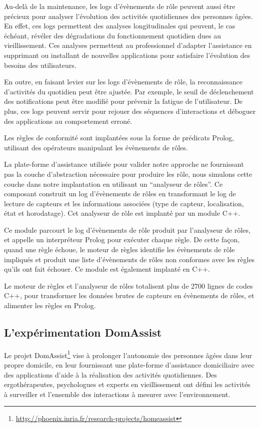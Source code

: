 Au-delà de la maintenance, les logs d'évènements de rôle peuvent aussi être 
précieux pour analyser l'évolution des activités quotidiennes des 
personnes âgées. En effet, ces logs permettent des analyses longitudinales qui 
peuvent, le cas échéant, révéler des dégradations du fonctionnement quotidien dues au 
vieillissement. Ces analyses permettent au professionnel d'adapter l'assistance 
en supprimant ou installant de nouvelles applications pour satisfaire l'évolution 
des besoins des utilisateurs. 

En outre, en faisant levier sur les logs d'évènements de rôle, la 
reconnaissance d'activités du quotidien peut être ajustée. Par exemple, le seuil 
de déclenchement des notifications peut être modifié pour prévenir la fatigue 
de l'utilisateur. De plus, ces logs peuvent servir pour rejouer des séquences 
d'interactions et déboguer des applications au comportement erroné.

Les règles de conformité sont implantées sous la forme de prédicats Prolog, utilisant 
des opérateurs manipulant les évènements de rôles. 

La plate-forme d'assistance utilisée pour valider notre approche ne fournissant 
pas la couche d'abstraction nécessaire pour produire les rôle, nous simulons 
cette couche dans notre implantation en utilisant un ``analyseur de rôles''. Ce 
composant construit un log d'évènements de rôles en transformant le log de 
lecture de capteurs et les informations associées (type de capteur, localisation, 
état et horodatage). Cet analyseur de rôle est implanté par un module C++.

Ce module parcourt le log d'évènements de rôle produit par l'analyseur de rôles, 
et appelle un interpréteur Prolog pour exécuter chaque règle. De cette façon, 
quand une règle échoue, le moteur de règles identifie les évènements de rôle 
impliqués et produit une liste d'évènements de rôles non conformes avec les 
règles qu'ils ont fait échouer. Ce module est également implanté en C++. 
\newline

Le moteur de règles et l'analyseur de rôles totalisent plus de 2700 lignes de codes C++, 
pour transformer les données brutes de capteurs en évènements de rôles, et alimenter les règles en Prolog.

\subsection{L'expérimentation DomAssist}\label{seq:fiabilite:validation:domassist}
Le projet DomAssist\footnote{\url{http://phoenix.inria.fr/research-projects/homeassist}} 
vise à prolonger l'autonomie des personnes âgées dans leur propre 
domicile, en leur fournissant une plate-forme d'assistance domiciliaire avec des 
applications d'aide à la réalisation des activités quotidiennes. 
Des ergothérapeutes, psychologues et experts en vieillissement ont défini les 
activités à surveiller et l'ensemble des interactions à mesurer avec l'environnement.


